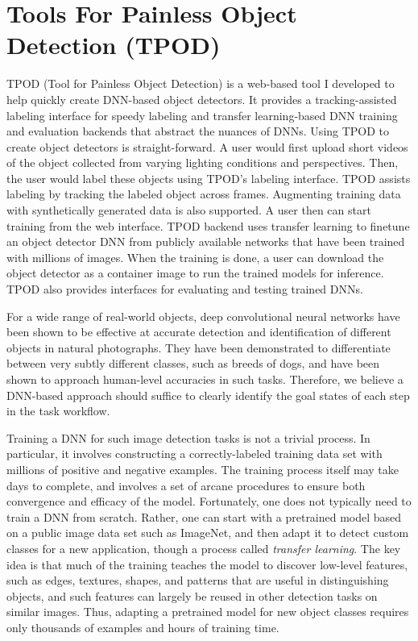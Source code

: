 \section{Tools For Painless Object Detection (TPOD)}
\label{sec: app-dev-tpod}

TPOD (Tool for Painless Object Detection) is a web-based tool I developed to
help quickly create DNN-based object detectors. It provides a tracking-assisted
labeling interface for speedy labeling and transfer learning-based DNN training
and evaluation backends that abstract the nuances of DNNs. Using TPOD to create
object detectors is straight-forward. A user would first upload short videos of
the object collected from varying lighting conditions and perspectives. Then,
the user would label these objects using TPOD's labeling interface. TPOD assists
labeling by tracking the labeled object across frames. Augmenting training data
with synthetically generated data is also supported. A user then can start training
from the web interface. TPOD backend uses transfer learning to finetune an
object detector DNN from publicly available networks that have been trained with
millions of images. When the training is done, a user can download the object
detector as a container image to run the trained models for inference. TPOD also
provides interfaces for evaluating and testing trained DNNs.

For a wide range of real-world objects, deep convolutional neural networks
have been shown to be effective at accurate detection and identification of
different objects in natural photographs.  They have been demonstrated to
differentiate between very subtly different classes, such as breeds of
dogs, and have been shown to approach human-level accuracies in such tasks.
Therefore, we believe a DNN-based approach should suffice to clearly
identify the goal states of each step in the task workflow.

Training a DNN for such image detection tasks is not a trivial process.  In
particular, it involves constructing a correctly-labeled training data set
with millions of positive and negative examples.  The training process
itself may take days to complete, and involves a set of arcane procedures
to ensure both convergence and efficacy of the model.  Fortunately, one
does not typically need to train a DNN from scratch.  Rather, one can start
with a pretrained model based on a public image data set such as ImageNet,
and then adapt it to detect custom classes for a new application, though a
process called \emph{transfer learning}.  The key idea is that much of the
training teaches the model to discover low-level features, such as edges,
textures, shapes, and patterns that are useful in distinguishing objects,
and such features can largely be reused in other detection tasks on similar
images.  Thus, adapting a pretrained model for new object classes requires
only thousands of examples and hours of training time.

